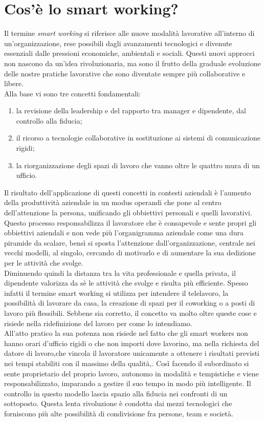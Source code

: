 
\section{Cos'è lo smart working?}
Il termine \textit{smart working} si riferisce alle nuove modalità lavorative all'interno di \mbox{un'organizzazione}, rese possibili dagli avanzamenti tecnologici e divenute essenziali dalle pressioni economiche, ambientali e sociali. Questi nuovi approcci non nascono da un'idea rivoluzionaria, ma sono il frutto della graduale evoluzione delle nostre pratiche lavorative che sono diventate sempre più collaborative e libere. \\Alla base vi sono tre concetti fondamentali:
\begin{enumerate}
	\item la revisione della leadership e del rapporto tra manager e dipendente, dal controllo alla fiducia;
	\item il ricorso a tecnologie collaborative in sostituzione ai sistemi di comunicazione rigidi;
	\item la riorganizzazione degli spazi di lavoro che vanno oltre le quattro mura di un ufficio.
\end{enumerate}
\newpage
Il risultato dell'applicazione di questi concetti in contesti aziendali è l'aumento della produttività aziendale in un modus operandi che pone al centro dell'attenzione la persona, unificando gli obbiettivi personali e quelli lavorativi. Questo processo responsabilizza il lavoratore che è consapevole e sente propri gli obbiettivi aziendali e non vede più l'organigramma aziendale come una dura piramide da scalare, bensì si sposta l'attenzione dall'organizzazione, centrale nei vecchi modelli, al singolo, cercando di motivarlo e di aumentare la sua dedizione per le attività che svolge.\\
Diminuendo quindi la distanza tra la vita professionale e quella privata, il dipendente valorizza da sè le attività che svolge e risulta più efficiente.
Spesso infatti il termine smart working si utilizza per intendere il telelavoro, la possibilità di lavorare da casa, la creazione di spazi per il coworking o a posti di lavoro più flessibili. Sebbene sia corretto, il concetto va molto oltre queste cose e risiede nella ridefinizione del lavoro per come lo intendiamo.\\ All'atto pratico la sua potenza non risiede nel fatto che gli smart workers non hanno orari d'ufficio rigidi o che non importi dove lavorino, ma nella richiesta del datore di \mbox{lavoro},che vincola il lavoratore unicamente a ottenere i risultati previsti nei tempi stabiliti con il massimo della qualità,. Così facendo il subordinato si sente proprietario del proprio lavoro, autonomo in modalità e tempistiche e viene responsabilizzato, imparando a gestire il suo tempo in modo più intelligente. Il controllo in questo modello lascia spazio alla fiducia nei confronti di un sottoposto. Questa lenta rivoluzione è condotta dai mezzi tecnologici che forniscono più alte possibilità di condivisione fra persone, team e società.\\
